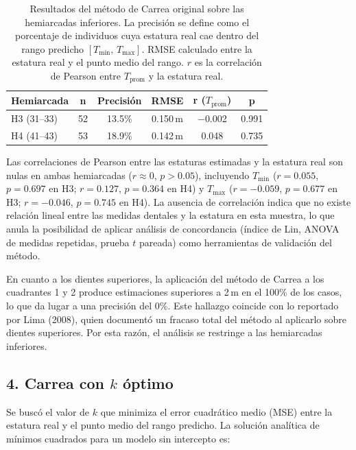 \documentclass[11pt,letterpaper]{article}
\begin{document}
\begin{table}[h!]
\centering
\begin{tabular}{lccccc}
\toprule
\textbf{Hemiarcada} & \textbf{n} & \textbf{Precisión} & \textbf{RMSE} &
\textbf{r ($T_{\text{prom}}$)} & \textbf{p} \\
\midrule
H3 (31--33) & 52 & 13.5\% & 0.150\,m & $-$0.002 & 0.991 \\
H4 (41--43) & 53 & 18.9\% & 0.142\,m &    0.048  & 0.735 \\
\bottomrule
\end{tabular}
\caption{Resultados del método de Carrea original sobre las hemiarcadas inferiores. La precisión se define como el porcentaje de individuos cuya estatura real cae dentro del rango predicho $[T_{\min},\, T_{\max}]$. RMSE calculado entre la estatura real y el punto medio del rango. $r$ es la correlación de Pearson entre $T_{\text{prom}}$ y la estatura real.}
\label{tab:carrea_original}
\end{table}

Las correlaciones de Pearson entre las estaturas estimadas y la estatura real son nulas en ambas hemiarcadas ($r \approx 0$, $p > 0.05$), incluyendo $T_{\min}$ ($r = 0.055$, $p = 0.697$ en H3; $r = 0.127$, $p = 0.364$ en H4) y $T_{\max}$ ($r = -0.059$, $p = 0.677$ en H3; $r = -0.046$, $p = 0.745$ en H4). La ausencia de correlación indica que no existe relación lineal entre las medidas dentales y la estatura en esta muestra, lo que anula la posibilidad de aplicar análisis de concordancia (índice de Lin, ANOVA de medidas repetidas, prueba $t$ pareada) como herramientas de validación del método.

En cuanto a los dientes superiores, la aplicación del método de Carrea a los cuadrantes 1 y 2 produce estimaciones superiores a 2\,m en el 100\% de los casos, lo que da lugar a una precisión del 0\%. Este hallazgo coincide con lo reportado por Lima (2008), quien documentó un fracaso total del método al aplicarlo sobre dientes superiores. Por esta razón, el análisis se restringe a las hemiarcadas inferiores.

\subsection*{4. Carrea con $k$ óptimo}

Se buscó el valor de $k$ que minimiza el error cuadrático medio (MSE) entre la estatura real y el punto medio del rango predicho. La solución analítica de mínimos cuadrados para un modelo sin intercepto es:
\end{document}
